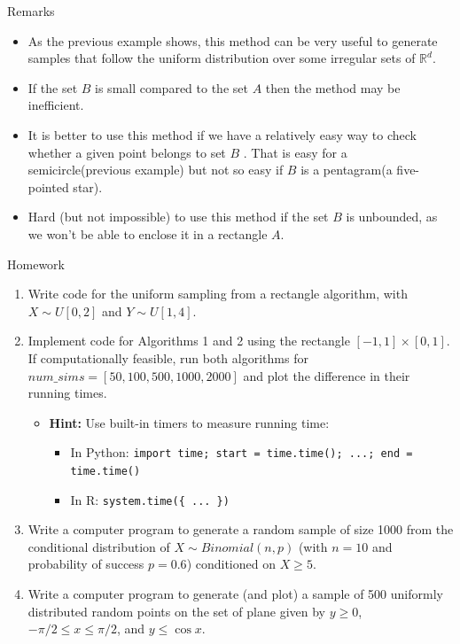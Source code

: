 \documentclass[8pt]{beamer}
\begin{document}
\begin{frame}{Remarks}
\begin{itemize}
	\item As the previous example shows, this method can be very useful to generate samples that follow the uniform distribution over some irregular  sets of $\mathbb{R}^d$.
	\item If the set $B$ is small compared to the set $A$ then the method may be inefficient.
	\item It is better to use this method if we have a relatively easy way to check whether a given point belongs to set $B$ . That is easy for a semicircle(previous example) but not so easy if $B$ is a pentagram(a five-pointed star).
	\item Hard (but not impossible) to use this method if the set $B$ is unbounded, as we won't be able to enclose it in a rectangle $A$.
\end{itemize}
\end{frame}

\begin{frame}{Homework}
\begin{enumerate}
	\item Write code for the uniform sampling from a rectangle algorithm, with $X \sim U[0,2]$ and $Y \sim U[1,4]$.
	\item Implement code for Algorithms 1 and 2 using the rectangle $[-1,1] \times [0,1]$. If computationally feasible, run both algorithms for $num\_sims = [50, 100, 500, 1000, 2000]$ and plot the difference in their running times.
		\begin{itemize}
	          \item \textbf{Hint:} Use built-in timers to measure running time:
	          \begin{itemize}
	              \item In Python: \texttt{import time; start = time.time(); ...; end = time.time()}
	              \item In R: \texttt{system.time(\{ ... \})}
	          \end{itemize}
	      \end{itemize}
	\item Write a computer program to generate a random sample of size 1000 from the conditional distribution of $X \sim Binomial(n,p)$  (with $n=10$ and probability of success $p=0.6$) conditioned on $X\geq 5$. 
	\item Write a computer program to generate (and plot) a sample of 500 uniformly distributed random points on the set of plane given by $y\geq 0$, $-\pi/2 \leq  x \leq \pi/2$, and $y \leq \cos x$.
\end{enumerate}
\end{frame}
\end{document}
